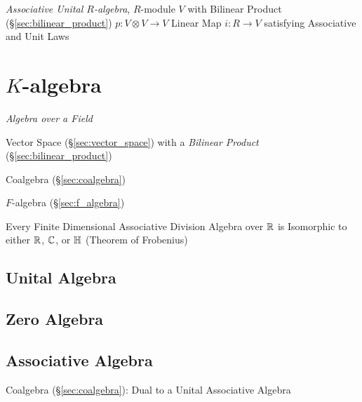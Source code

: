 \emph{Associative Unital $R$-algebra}, $R$-module $V$ with Bilinear
Product (\S\ref{sec:bilinear_product}) $p : V \otimes V \rightarrow V$
Linear Map $i : R \rightarrow V$ satisfying Associative and Unit Laws



\section{$K$-algebra}\label{sec:k_algebra}

\emph{Algebra over a Field}

Vector Space (\S\ref{sec:vector_space}) with a \emph{Bilinear Product}
(\S\ref{sec:bilinear_product})

Coalgebra (\S\ref{sec:coalgebra})

$F$-algebra (\S\ref{sec:f_algebra})

Every Finite Dimensional Associative Division Algebra over $\mathbb{R}$ is
Isomorphic to either $\mathbb{R}$, $\mathbb{C}$, or $\mathbb{H}$ (Theorem of
Frobenius) %



\subsection{Unital Algebra}\label{sec:unital_algebra}

\subsection{Zero Algebra}\label{sec:zero_algebra}

\subsection{Associative Algebra}\label{sec:associative_algebra}

Coalgebra (\S\ref{sec:coalgebra}): Dual to a Unital Associative
Algebra



